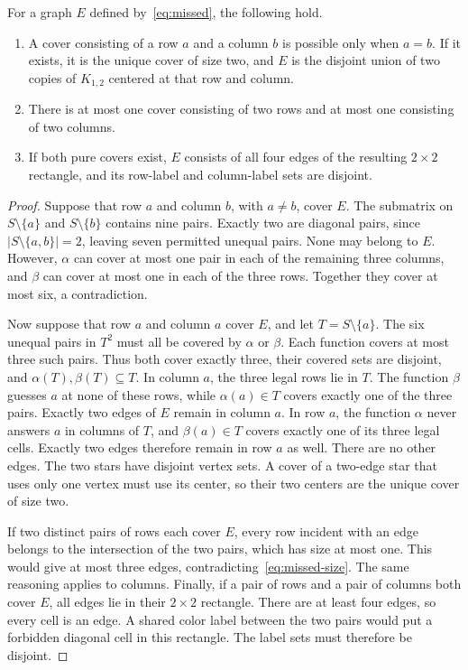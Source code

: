 \begin{lemma}\label{lem:covers}
For a graph $E$ defined by~\eqref{eq:missed}, the following hold.
\begin{enumerate}
\item A cover consisting of a row $a$ and a column $b$ is possible only
when $a=b$. If it exists, it is the unique cover of size two, and $E$ is
the disjoint union of two copies of $K_{1,2}$ centered at that row and column.
\item There is at most one cover consisting of two rows and at most one
consisting of two columns.
\item If both pure covers exist, $E$ consists of all four edges of the
resulting $2\times2$ rectangle, and its row-label and column-label sets are
disjoint.
\end{enumerate}
\end{lemma}
\begin{proof}
Suppose that row $a$ and column $b$, with $a\ne b$, cover $E$. The submatrix
on $S\setminus\{a\}$ and $S\setminus\{b\}$ contains nine pairs. Exactly two
are diagonal pairs, since $|S\setminus\{a,b\}|=2$, leaving seven permitted
unequal pairs. None may belong to $E$. However, $\alpha$ can cover at most
one pair in each of the remaining three columns, and $\beta$ can cover at
most one in each of the three rows. Together they cover at most six, a
contradiction.

Now suppose that row $a$ and column $a$ cover $E$, and let
$T=S\setminus\{a\}$. The six unequal pairs in $T^2$ must all be covered
by $\alpha$ or $\beta$. Each function covers at most three such pairs.
Thus both cover exactly three, their covered sets are disjoint, and
$\alpha(T),\beta(T)\subseteq T$. In column $a$, the three legal rows lie
in $T$. The function $\beta$ guesses $a$ at none of these rows, while
$\alpha(a)\in T$ covers exactly one of the three pairs. Exactly two edges
of $E$ remain in column $a$. In row $a$, the function $\alpha$ never
answers $a$ in columns of $T$, and $\beta(a)\in T$ covers exactly one
of its three legal cells. Exactly two edges therefore remain in row $a$
as well. There are no other edges. The two stars have disjoint
vertex sets. A cover of a two-edge star that uses only one vertex must use
its center, so their two centers are the unique cover of size two.

If two distinct pairs of rows each cover $E$, every row incident with an
edge belongs to the intersection of the two pairs, which has size at most
one. This would give at most three edges, contradicting~\eqref{eq:missed-size}.
The same reasoning applies to columns. Finally, if a pair of rows and a
pair of columns both cover $E$, all edges lie in their $2\times2$ rectangle.
There are at least four edges, so every cell is an edge. A shared color
label between the two pairs would put a forbidden diagonal cell in this
rectangle. The label sets must therefore be disjoint.
\end{proof}


